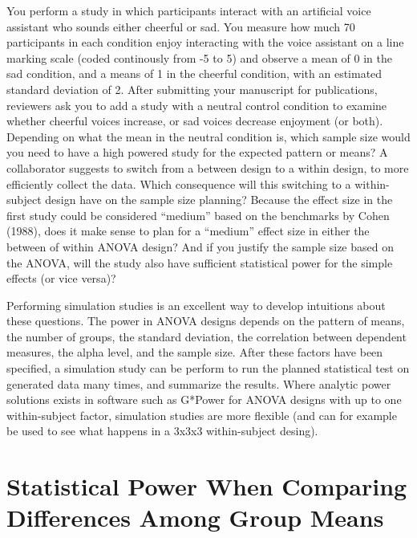 \documentclass[,man,floatsintext]{apa6}
\begin{document}
You perform a study in which participants interact with an artificial
voice assistant who sounds either cheerful or sad. You measure how much
70 participants in each condition enjoy interacting with the voice
assistant on a line marking scale (coded continously from -5 to 5) and
observe a mean of 0 in the sad condition, and a means of 1 in the
cheerful condition, with an estimated standard deviation of 2. After
submitting your manuscript for publications, reviewers ask you to add a
study with a neutral control condition to examine whether cheerful
voices increase, or sad voices decrease enjoyment (or both). Depending
on what the mean in the neutral condition is, which sample size would
you need to have a high powered study for the expected pattern or means?
A collaborator suggests to switch from a between design to a within
design, to more efficiently collect the data. Which consequence will
this switching to a within-subject design have on the sample size
planning? Because the effect size in the first study could be considered
\enquote{medium} based on the benchmarks by Cohen (1988), does it make
sense to plan for a \enquote{medium} effect size in either the between
of within ANOVA design? And if you justify the sample size based on the
ANOVA, will the study also have sufficient statistical power for the
simple effects (or vice versa)?

Performing simulation studies is an excellent way to develop intuitions
about these questions. The power in ANOVA designs depends on the pattern
of means, the number of groups, the standard deviation, the correlation
between dependent measures, the alpha level, and the sample size. After
these factors have been specified, a simulation study can be perform to
run the planned statistical test on generated data many times, and
summarize the results. Where analytic power solutions exists in software
such as G*Power for ANOVA designs with up to one within-subject factor,
simulation studies are more flexible (and can for example be used to see
what happens in a 3x3x3 within-subject desing).

\section{Statistical Power When Comparing Differences Among Group
Means}\label{statistical-power-when-comparing-differences-among-group-means}
\end{document}
